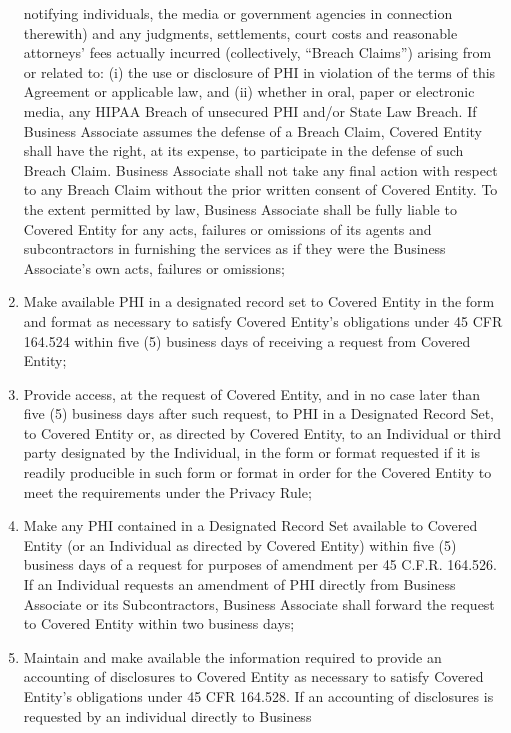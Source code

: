 \documentclass[11pt,a4paper]{article} %
\begin{document}
\begin{enumerate}
  notifying individuals, the media or government agencies in connection
  therewith) and any judgments, settlements, court costs and reasonable
  attorneys' fees actually incurred (collectively, ``Breach Claims'')
  arising from or related to: (i) the use or disclosure of PHI in
  violation of the terms of this Agreement or applicable law, and (ii)
  whether in oral, paper or electronic media, any HIPAA Breach of
  unsecured PHI and/or State Law Breach. If Business Associate assumes
  the defense of a Breach Claim, Covered Entity shall have the right, at
  its expense, to participate in the defense of such Breach Claim.
  Business Associate shall not take any final action with respect to any
  Breach Claim without the prior written consent of Covered Entity. To
  the extent permitted by law, Business Associate shall be fully liable
  to Covered Entity for any acts, failures or omissions of its agents
  and subcontractors in furnishing the services as if they were the
  Business Associate's own acts, failures or omissions;
\item
  Make available PHI in a designated record set to Covered Entity in the
  form and format as necessary to satisfy Covered Entity's obligations
  under 45 CFR 164.524 within five (5) business days of receiving a
  request from Covered Entity;
\item
  Provide access, at the request of Covered Entity, and in no case later
  than five (5) business days after such request, to PHI in a Designated
  Record Set, to Covered Entity or, as directed by Covered Entity, to an
  Individual or third party designated by the Individual, in the form or
  format requested if it is readily producible in such form or format in
  order for the Covered Entity to meet the requirements under the
  Privacy Rule;
\item
  Make any PHI contained in a Designated Record Set available to Covered
  Entity (or an Individual as directed by Covered Entity) within five
  (5) business days of a request for purposes of amendment per 45 C.F.R.
     164.526. If an Individual requests an amendment of PHI directly from
  Business Associate or its Subcontractors, Business Associate shall
  forward the request to Covered Entity within two business days;
\item
  Maintain and make available the information required to provide an
  accounting of disclosures to Covered Entity as necessary to satisfy
  Covered Entity's obligations under 45 CFR 164.528. If an accounting of
  disclosures is requested by an individual directly to Business

\end{enumerate}
\end{document}
